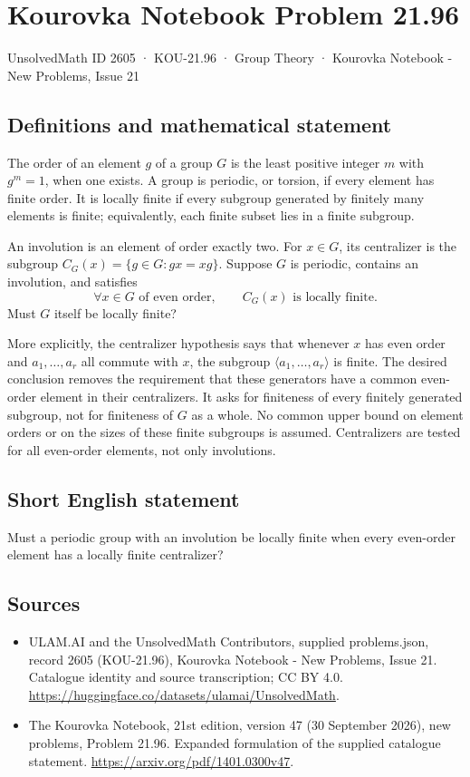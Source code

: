 \documentclass[11pt,a4paper]{article}
\begin{document}
\section*{Kourovka Notebook Problem 21.96}\label{2605}
{\small UnsolvedMath ID 2605 · KOU-21.96 · Group Theory · Kourovka Notebook - New Problems, Issue 21}
\subsection{Definitions and mathematical statement}
The order of an element $g$ of a group $G$ is the least positive integer $m$ with $g^m=1$, when one exists. A group is periodic, or torsion, if every element has finite order. It is locally finite if every subgroup generated by finitely many elements is finite; equivalently, each finite subset lies in a finite subgroup.

An involution is an element of order exactly two. For $x\in G$, its centralizer is the subgroup $C_G(x)=\{g\in G:gx=xg\}$. Suppose $G$ is periodic, contains an involution, and satisfies
\[
 \forall x\in G\text{ of even order},\qquad
 C_G(x)\text{ is locally finite}.
\]
Must $G$ itself be locally finite?

More explicitly, the centralizer hypothesis says that whenever $x$ has even order and $a_1,\ldots,a_r$ all commute with $x$, the subgroup $\langle a_1,\ldots,a_r\rangle$ is finite. The desired conclusion removes the requirement that these generators have a common even-order element in their centralizers. It asks for finiteness of every finitely generated subgroup, not for finiteness of $G$ as a whole. No common upper bound on element orders or on the sizes of these finite subgroups is assumed. Centralizers are tested for all even-order elements, not only involutions.
\subsection{Short English statement}
Must a periodic group with an involution be locally finite when every even-order element has a locally finite centralizer?
\subsection{Sources}
\begin{itemize}
\item[S1] ULAM.AI and the UnsolvedMath Contributors, supplied problems.json, record 2605 (KOU-21.96), Kourovka Notebook - New Problems, Issue 21. Catalogue identity and source transcription; CC BY 4.0.
\url{https://huggingface.co/datasets/ulamai/UnsolvedMath}.
\item[S2] The Kourovka Notebook, 21st edition, version 47 (30 September 2026), new problems, Problem 21.96. Expanded formulation of the supplied catalogue statement.
\url{https://arxiv.org/pdf/1401.0300v47}.
\end{itemize}
\end{document}
